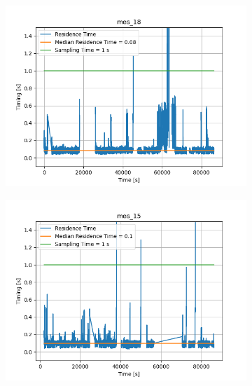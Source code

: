 \begin{figure}[H]
\begin{minipage}{0.49\textwidth}
\begin{figure}[H]
        \end{figure}
    \end{minipage}
    \begin{minipage}{0.49\textwidth}
        \begin{figure}[H]
            \includegraphics[width=\textwidth]{figs/res_time/mes_18_timing_stuff.png}
        \end{figure}
    \end{minipage}
    \begin{minipage}{0.49\textwidth}
        \begin{figure}[H]
            \includegraphics[width=\textwidth]{figs/res_time/mes_15_timing_stuff.png}
        \end{figure}

\end{minipage}
\end{figure}
